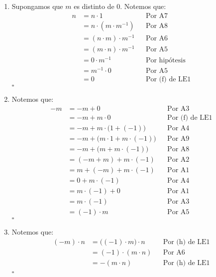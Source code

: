 \documentclass[11pt]{article}
\begin{document}
\begin{enumerate}[label=\alph*), font=\bfseries]
    \item Supongamos que $m$ es distinto de $0$. Notemos que:
    \begin{align*}
        n &= n \cdot 1	&& \text{Por A7} \\
        &= n \cdot  \left(m \cdot m^{-1}  \right) 	&& \text{Por A8} \\
        &= \left(n \cdot m \right)  \cdot m^{-1}	&& \text{Por A6} \\
        &= \left(m \cdot n \right)  \cdot m^{-1}	&& \text{Por A5} \\
        &= 0 \cdot m^{-1}	&& \text{Por hipótesis}\\
        &= m^{-1} \cdot 0	&& \text{Por A5}\\
        &= 0 && \text{Por (f) de LE1}
    \end{align*} \mbox{}\hfill $\square$
    
    \item Notemos que:
    \begin{align*}
        -m&=-m+0 && \text{Por A3} \\
        &=-m+m \cdot 0 && \text{Por (f) de LE1} \\
        &=-m+m \cdot  \bigl( 1+ \left( -1 \right)  \bigr) && \text{Por A4} \\
        &=-m+ \bigl( m \cdot 1+m \cdot  \left( -1 \right)  \bigr) && \text{Por A9} \\
        &=-m+ \bigl( m+m \cdot  \left( -1 \right)  \bigr) && \text{Por A8} \\
        &= \left( -m+m \right) +m \cdot  \left( -1 \right) && \text{Por A2} \\
        &=m+ \left( -m \right) +m \cdot  \left( -1 \right) && \text{Por A1} \\
        &=0+m \cdot  \left( -1 \right) && \text{Por A4} \\
        &=m \cdot  \left( -1 \right) + 0 && \text{Por A1} \\
        &=m \cdot  \left( -1 \right) && \text{Por A3} \\
        &= \left( -1 \right)  \cdot m && \text{Por A5}
    \end{align*} \mbox{}\hfill $\square$
    
    \item Notemos que:
    \begin{align*}
        (-m) \cdot n &= \bigl( \left(-1 \right) \cdot m \bigr) \cdot n && \text{Por (h) de LE1}\\
        &= (-1) \cdot (m \cdot n) && \text{Por A6}\\
        &= -(m \cdot n) && \text{Por (h) de LE1}\\
    \end{align*} \mbox{}\hfill $\square$


\end{enumerate}
\end{document}
